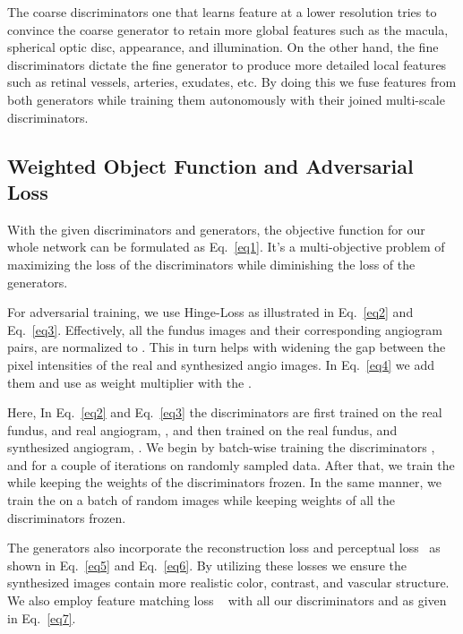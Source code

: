 \documentclass[a4paper,conference]{IEEEtran}
\begin{document}
The coarse discriminators one that learns feature at a lower resolution tries to convince the coarse generator to retain more global features such as the macula, spherical optic disc, appearance, and illumination. On the other hand,  the fine discriminators dictate the fine generator to produce more detailed local features such as retinal vessels, arteries, exudates,  etc. By doing this we fuse features from both generators while training them autonomously with their joined multi-scale discriminators.

\subsection{Weighted Object Function and Adversarial Loss}
\label{subsec:objective}

With the given discriminators and generators, the objective function for our whole network can be formulated as Eq.~\ref{eq1}. It's a multi-objective problem of maximizing the loss of the discriminators while diminishing the loss of the generators. 
 

For adversarial training, we use Hinge-Loss \cite{zhang2019self,lim2017geometric} as illustrated in Eq.~\ref{eq2} and Eq.~\ref{eq3}. Effectively, all the fundus images and their corresponding angiogram pairs, are normalized to . This in turn helps with widening the gap between the pixel intensities of the real and synthesized angio images. In Eq.~\ref{eq4} we add them and use  as weight multiplier with the .



Here, In Eq.~\ref{eq2} and Eq.~\ref{eq3} the discriminators are first trained on the real fundus,  and real angiogram, , and then trained on the real fundus,  and synthesized angiogram, . We begin by batch-wise training the discriminators , and  for a couple of iterations on randomly sampled data. After that, we train the  while keeping the weights of the discriminators frozen. In the same manner, we train the  on a batch of random images while keeping weights of all the discriminators frozen. 

The generators also incorporate the reconstruction loss and perceptual loss~\cite{johnson2016perceptual} as shown in Eq.~\ref{eq5} and Eq.~\ref{eq6}. By utilizing these losses we ensure the synthesized images contain more realistic color, contrast, and vascular structure. We also employ feature matching loss ~\cite{wang2018high} with all our discriminators and as given in Eq.~\ref{eq7}.
\end{document}
